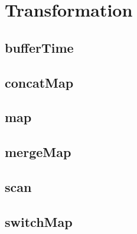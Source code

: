 \chapter{Transformation}

\section{bufferTime}

\section{concatMap}

\section{map} 

\section{mergeMap}

\section{scan}

\section{switchMap}